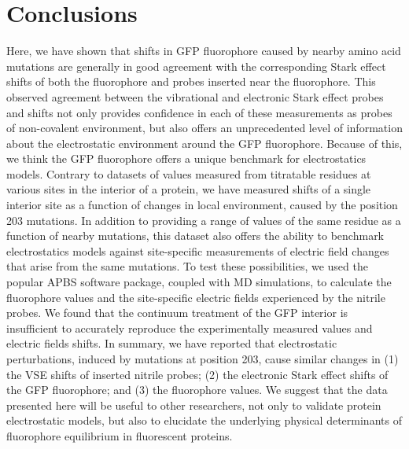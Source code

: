 \section{Conclusions}\label{pKa-conclusion}


Here, we have shown that shifts in GFP fluorophore \pKa{} caused by nearby amino acid mutations are generally in good agreement with the corresponding Stark effect shifts of both the fluorophore and \pCNF{} probes inserted near the fluorophore.
This observed agreement between the vibrational and electronic Stark effect probes and \pKa{} shifts not only provides confidence in each of these measurements as probes of non-covalent environment, but also offers an unprecedented level of information about the electrostatic environment around the GFP fluorophore.
Because of this, we think the GFP fluorophore offers a unique benchmark for electrostatics models.
Contrary to datasets of \pKa{} values measured from titratable residues at various sites in the interior of a protein, we have measured \pKa{} shifts of a single interior site as a function of changes in local environment, caused by the position 203 mutations.
In addition to providing a range of \pKa{} values of the same residue as a function of nearby mutations, this dataset also offers the ability to benchmark electrostatics models against site-specific measurements of electric field changes that arise from the same mutations.
To test these possibilities, we used the popular APBS software package, coupled with MD simulations, to calculate the fluorophore \pKa{} values and the site-specific electric fields experienced by the nitrile probes.
We found that the continuum treatment of the GFP interior is insufficient to accurately reproduce the experimentally measured \pKa{} values and electric fields shifts.
In summary, we have reported that electrostatic perturbations, induced by mutations at position 203, cause similar changes in (1) the VSE shifts of inserted nitrile probes; (2) the electronic Stark effect shifts of the GFP fluorophore; and (3) the fluorophore \pKa{} values.
We suggest that the data presented here will be useful to other researchers, not only to validate protein electrostatic models, but also to elucidate the underlying physical determinants of fluorophore equilibrium in fluorescent proteins. 
